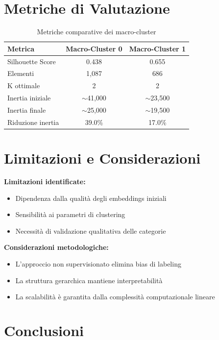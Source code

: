 \documentclass[12pt,a4paper]{article}
\begin{document}
\section{Metriche di Valutazione}

\begin{table}[H]
\centering
\begin{tabular}{lcc}
\toprule
\textbf{Metrica} & \textbf{Macro-Cluster 0} & \textbf{Macro-Cluster 1} \\
\midrule
Silhouette Score & 0.438 & 0.655 \\
Elementi & 1,087 & 686 \\
K ottimale & 2 & 2 \\
Inertia iniziale & $\sim$41,000 & $\sim$23,500 \\
Inertia finale & $\sim$25,000 & $\sim$19,500 \\
Riduzione inertia & 39.0\% & 17.0\% \\
\bottomrule
\end{tabular}
\caption{Metriche comparative dei macro-cluster}
\label{tab:metrics}
\end{table}

\section{Limitazioni e Considerazioni}

\textbf{Limitazioni identificate:}
\begin{itemize}
    \item Dipendenza dalla qualità degli embeddings iniziali
    \item Sensibilità ai parametri di clustering
    \item Necessità di validazione qualitativa delle categorie
\end{itemize}

\textbf{Considerazioni metodologiche:}
\begin{itemize}
    \item L'approccio non supervisionato elimina bias di labeling
    \item La struttura gerarchica mantiene interpretabilità
    \item La scalabilità è garantita dalla complessità computazionale lineare
\end{itemize}

\section{Conclusioni}
\end{document}
